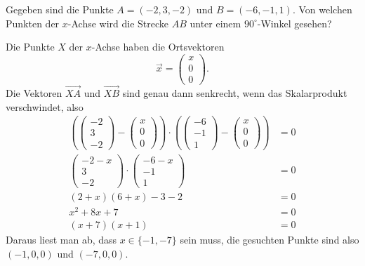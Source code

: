 Gegeben sind die Punkte $A=(-2,3,-2)$ und $B=(-6,-1,1)$. Von welchen Punkten
der $x$-Achse wird die Strecke $AB$ unter einem $90^\circ$-Winkel gesehen?

\begin{loesung}
Die Punkte $X$ der $x$-Achse haben die Ortsvektoren
\[
\vec x=\begin{pmatrix}x\\0\\0\end{pmatrix}
.
\]
Die Vektoren $\overset{\rightarrow}{XA}$ und $\overset{\rightarrow}{XB}$ sind
genau dann senkrecht, wenn das Skalarprodukt verschwindet, also
\begin{align*}
\left(
\begin{pmatrix}-2\\3\\-2\end{pmatrix}
-
\begin{pmatrix}x\\0\\0\end{pmatrix}
\right)\cdot\left(
\begin{pmatrix}-6\\-1\\1\end{pmatrix}
-
\begin{pmatrix}x\\0\\0\end{pmatrix}
\right)
&=0
\\
\begin{pmatrix}-2-x\\3\\-2\end{pmatrix}
\cdot
\begin{pmatrix}-6-x\\-1\\1\end{pmatrix}
&=0
\\
(2+x)(6+x)-3-2&=0\\
x^2+8x+7&=0\\
(x+7)(x+1)&=0
\end{align*}
Daraus liest man ab, dass $x\in\{-1,-7\}$ sein muss, die gesuchten Punkte
sind also $(-1,0,0)$ und $(-7,0,0)$.
\end{loesung}

